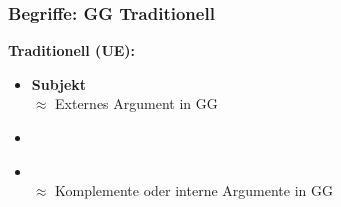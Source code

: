 \begin{frame}
\frametitle{Begriffe: GG \vs Traditionell}

\begin{minipage}[b]{0.4\textwidth}
	\footnotesize
	\textbf{Traditionell (UE):}
		\begin{itemize}
		\item \textbf{Subjekt}\\
		$\approx$ Externes Argument in GG
		\item[]
		\item {}\\
		$\approx$ Komplemente oder interne Argumente in GG
		\end{itemize}	
  	\end{minipage}  
	\begin{minipage}[b]{0.55\textwidth}
		\begin{figure}
	\centering
	
	\end{figure}
\end{minipage}

\end{frame}


